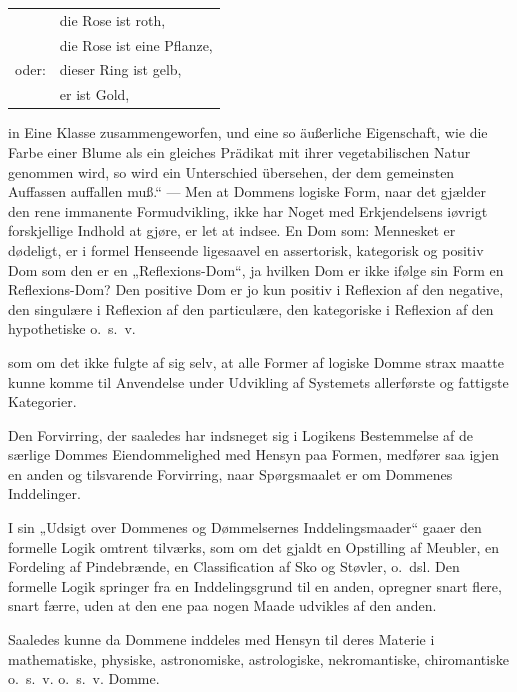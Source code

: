 \documentclass[12pt]{book}
\newcommand{\opage}[1]{\marginnote{\footnotesize\textit{[#1]}}}
\begin{document}
{\begin{center}\begin{tabular}{r@{\ }l}
 & die Rose ist roth,\\
 & die Rose ist eine Pflanze,\\
oder: & dieser Ring ist gelb,\\
 & er ist Gold,
\end{tabular}\end{center}
in Eine Klasse zusammengeworfen, und eine so äußerliche Eigenschaft, wie die Farbe einer Blume als ein gleiches Prädikat mit ihrer vegetabilischen Natur genommen wird, so wird ein Unterschied übersehen, der dem gemeinsten Auffassen auffallen muß.“ --- Men at Dommens logiske Form, naar det gjælder den rene immanente Formudvikling, ikke har Noget med Erkjendelsens iøvrigt forskjellige Indhold at gjøre, er let at indsee. En Dom som: Mennesket er dødeligt, er i formel Henseende ligesaavel en assertorisk, kategorisk og positiv Dom som den er en „Reflexions-Dom“, ja hvilken Dom er ikke ifølge sin Form en Reflexions-Dom? Den positive Dom er jo kun positiv i Reflexion af den negative, den singulære i Reflexion af den particulære, den kategoriske i Reflexion af den hypothetiske o.~s.~v.}%
{} som om det ikke fulgte af sig selv, at alle Former %
\opage{51}af logiske Domme strax maatte kunne komme til Anvendelse under Udvikling af Systemets allerførste og fattigste Kategorier.

Den Forvirring, der saaledes har indsneget sig i Logikens %
\opage{52}Bestemmelse af de særlige Dommes Eiendommelighed med Hensyn paa Formen, medfører saa igjen en anden og tilsvarende Forvirring, naar Spørgsmaalet er om Dommenes Inddelinger.

I sin „Udsigt over Dommenes og Dømmelsernes Inddelingsmaader“ gaaer den formelle Logik omtrent tilværks, som om det gjaldt en Opstilling af Meubler, en Fordeling af Pindebrænde, en Classification af Sko og Støvler, o.~dsl. Den formelle Logik springer fra en Inddelingsgrund til en anden, opregner snart flere, snart færre, uden at den ene paa nogen Maade udvikles af den anden.

Saaledes kunne da Dommene inddeles med Hensyn til deres Materie i mathematiske, physiske, astronomiske, astrologiske, nekromantiske, chiromantiske o.~s.~v. o.~s.~v. Domme.
\end{document}
